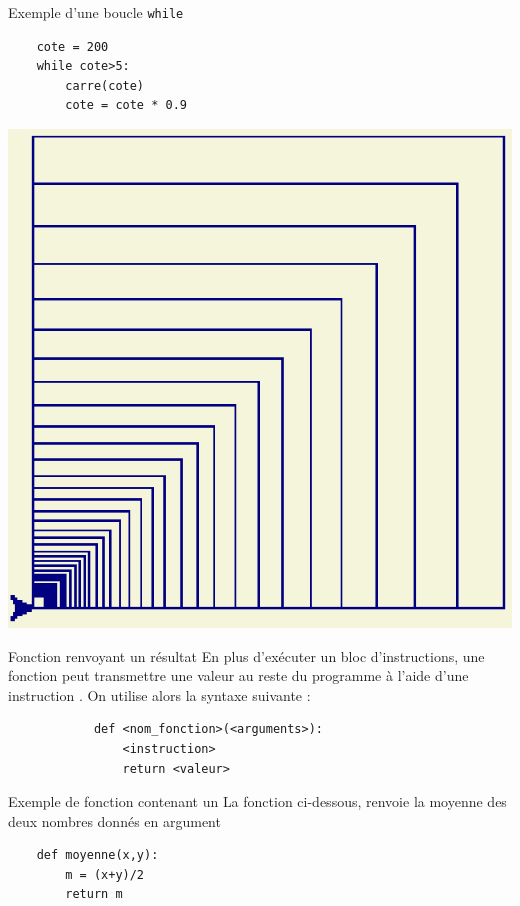\documentclass[10pt]{beamer}
\begin{document}
\begin{frame}[fragile]
	\mframe{\Python}
	\begin{exampleblock}{Exemple d'une boucle {\tt while}}
		\begin{lstlisting}
 	cote = 200
	while cote>5:
    	carre(cote)
     	cote = cote * 0.9
		\end{lstlisting}
		\begin{center}
			\includegraphics[scale=0.3]{ex_cours.eps}
		\end{center}
	\end{exampleblock}
\end{frame}

\begin{frame}[fragile]
	\mframe{\Python}
	\begin{alertblock}{Fonction renvoyant un résultat}
		En plus d'exécuter un bloc d'instructions, une fonction peut transmettre une valeur au reste du programme à l'aide d'une instruction .
		On utilise alors la syntaxe suivante : 
		\begin{lstlisting}
			def <nom_fonction>(<arguments>):
				<instruction>
				return <valeur>
			\end{lstlisting}
	\end{alertblock}
\end{frame}

\begin{frame}[fragile]
	\mframe{\Python}
	\begin{exampleblock}{Exemple de fonction contenant un }
		La fonction ci-dessous, renvoie la moyenne des deux nombres donnés en argument
		\begin{lstlisting}
 	def moyenne(x,y):
		m = (x+y)/2
		return m
		\end{lstlisting}
	\end{exampleblock}
\end{frame}
\end{document}
